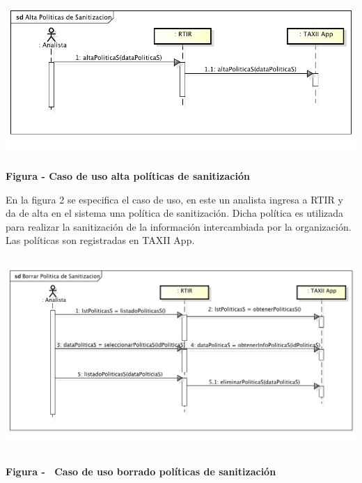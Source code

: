 \begin{center}
	\includegraphics[width=5.7638in,height=2.3575in]{Analisis22-img/Analisis22-img017.png} 
\end{center}
{\centering{}\bfseries
	\foreignlanguage{spanish}{Figura }\foreignlanguage{spanish}{ -
	}\foreignlanguage{spanish}{Caso de uso }\foreignlanguage{spanish}{alta políticas de sanitización}
	\par}
{
	\bigskip
	En la figura 2 se especifica el caso de uso, en este un analista ingresa a RTIR y da de alta en el sistema una política
	de sanitización. Dicha política es utilizada para realizar la sanitización de la información intercambiada por la
	organización. Las políticas son registradas en TAXII App.}
\begin{center}
	\includegraphics[width=5.7638in,height=2.9146in]{Analisis22-img/Analisis22-img018.png} 
\end{center}
{\centering{}\bfseries
	\foreignlanguage{spanish}{Figura }\foreignlanguage{spanish}{ - \ Caso de uso borrado
		políticas de sanitización}
	\par}
\bigskip

